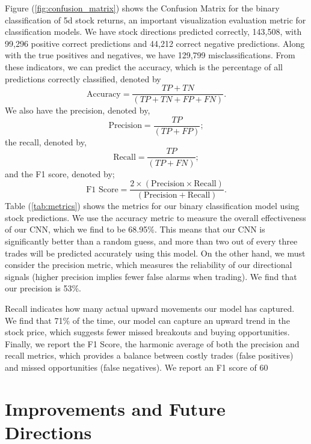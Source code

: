 \documentclass[12pt]{article}
\begin{document}
Figure (\ref{fig:confusion_matrix}) shows the Confusion Matrix for the binary classification of 5d stock returns, an important visualization evaluation metric for classification models. We have stock directions predicted correctly, 143,508, with 99,296 positive correct predictions and 44,212 correct negative predictions. Along with the true positives and negatives, we have 129,799 misclassifications. From these indicators, we can predict the accuracy, which is the percentage of all predictions correctly classified, denoted by
\begin{equation}
	\text{Accuracy}=\frac{TP+TN}{(TP+TN+FP+FN)}.
\end{equation}
We also have the precision, denoted by,
\begin{equation}
	\text{Precision}=\frac{TP}{(TP+FP)};
\end{equation}
the recall, denoted by,
\begin{equation}
	\text{Recall}=\frac{TP}{(TP+FN)};
\end{equation}
and the F1 score, denoted by;
\begin{equation}
	\text{F1 Score}=\frac{2\times (\text{Precision}\times\text{Recall})}{(\text{Precision}+\text{Recall})}.
\end{equation}
Table (\ref{tab:metrics}) shows the metrics for our binary classification model using stock predictions. We use the accuracy metric to measure the overall effectiveness of our CNN, which we find to be 68.95\%. This means that our CNN is significantly better than a random guess, and more than two out of every three trades will be predicted accurately using this model. On the other hand, we must consider the precision metric, which measures the reliability of our directional signals (higher precision implies fewer false alarms when trading). We find that our precision is 53\%.

Recall indicates how many actual upward movements our model has captured. We find that 71\% of the time, our model can capture an upward trend in the stock price, which suggests fewer missed breakouts and buying opportunities. Finally, we report the F1 Score, the harmonic average of both the precision and recall metrics, which provides a balance between costly trades (false positives) and missed opportunities (false negatives). We report an F1 score of 60%

\section*{Improvements and Future Directions}
\end{document}
